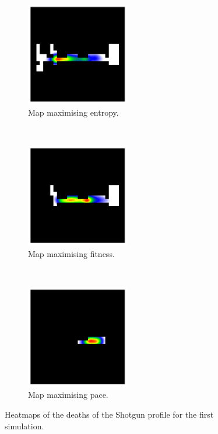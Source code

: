 \begin{figure}[H]
    \centering
    \begin{subfigure}[t]{0.3\textwidth}
        \centering
        \includegraphics[height=4.5cm]{Images/images/experiment_one/best_entropy_pop_0/deaths_bot_0.png}
        \caption{Map maximising entropy.}
    \end{subfigure}%
    ~ 
    \begin{subfigure}[t]{0.3\textwidth}
        \centering
        \includegraphics[height=4.5cm]{Images/images/experiment_one/best_fitness_pop_0/deaths_bot_0.png}
        \caption{Map maximising fitness.}
    \end{subfigure}
    ~ 
    \begin{subfigure}[t]{0.3\textwidth}
        \centering
        \includegraphics[height=4.5cm]{Images/images/experiment_one/best_pace_pop_0/deaths_bot_0.png}
        \caption{Map maximising pace.}
    \end{subfigure}
    \caption{Heatmaps of the deaths of the Shotgun profile for the first simulation.}
    \label{fig:ex_one_begin_heatmaps}
\end{figure}
